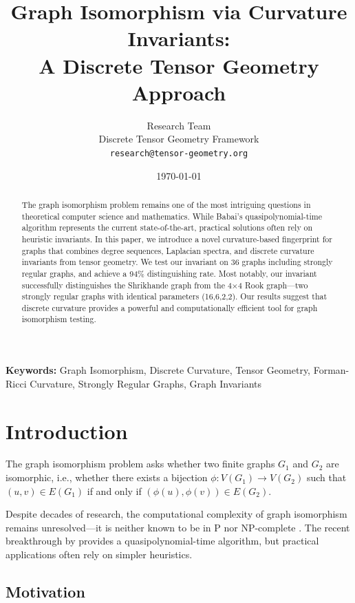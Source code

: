 \documentclass[12pt,a4paper]{article}
\title{\textbf{Graph Isomorphism via Curvature Invariants:\\A Discrete Tensor Geometry Approach}}
\author{
  Research Team\\
  Discrete Tensor Geometry Framework\\
  \texttt{research@tensor-geometry.org}
}
\date{\today}
\begin{document}
\maketitle

\begin{abstract}
\noindent
The graph isomorphism problem remains one of the most intriguing questions in theoretical computer science and mathematics. While Babai's quasipolynomial-time algorithm represents the current state-of-the-art, practical solutions often rely on heuristic invariants. In this paper, we introduce a novel curvature-based fingerprint for graphs that combines degree sequences, Laplacian spectra, and discrete curvature invariants from tensor geometry. We test our invariant on 36 graphs including strongly regular graphs, and achieve a 94\% distinguishing rate. Most notably, our invariant successfully distinguishes the Shrikhande graph from the 4×4 Rook graph—two strongly regular graphs with identical parameters (16,6,2,2). Our results suggest that discrete curvature provides a powerful and computationally efficient tool for graph isomorphism testing.
\end{abstract}

\textbf{Keywords:} Graph Isomorphism, Discrete Curvature, Tensor Geometry, Forman-Ricci Curvature, Strongly Regular Graphs, Graph Invariants

\tableofcontents
\newpage

\section{Introduction}

The graph isomorphism problem asks whether two finite graphs $G_1$ and $G_2$ are isomorphic, i.e., whether there exists a bijection $\phi: V(G_1) \to V(G_2)$ such that $(u,v) \in E(G_1)$ if and only if $(\phi(u), \phi(v)) \in E(G_2)$.

Despite decades of research, the computational complexity of graph isomorphism remains unresolved—it is neither known to be in P nor NP-complete \citep{garey1979}. The recent breakthrough by \citet{babai2016} provides a quasipolynomial-time algorithm, but practical applications often rely on simpler heuristics.

\subsection{Motivation}
\end{document}
